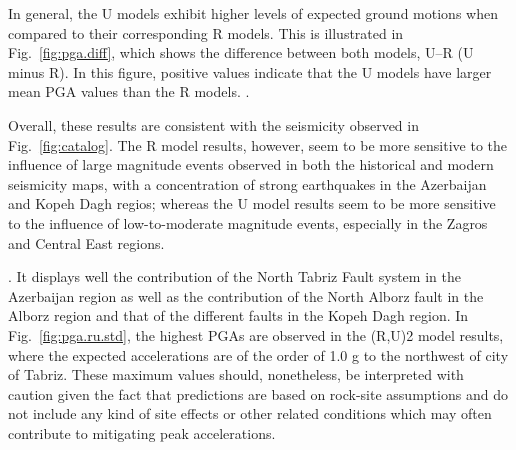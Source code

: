 In general, the U models exhibit higher levels of expected ground motions when compared to their corresponding R models. This is illustrated in Fig.~\ref{fig:pga.diff}, which shows the difference between both models, U--R (U minus R). In this figure, positive values indicate that the U models have larger mean PGA values than the R models. .

Overall, these results are consistent with the seismicity observed in Fig.~\ref{fig:catalog}. The R model results, however, seem to be more sensitive to the influence of large magnitude events observed in both the historical and modern seismicity maps, with a concentration of strong earthquakes in the Azerbaijan and Kopeh Dagh regios; whereas the U model results seem to be more sensitive to the influence of low-to-moderate magnitude events, especially in the Zagros and Central East regions.


. It displays well the contribution of the North Tabriz Fault system in the Azerbaijan region as well as the contribution of the North Alborz fault in the Alborz region and that of the different faults in the Kopeh Dagh region. In Fig.~\ref{fig:pga.ru.std}, the highest PGAs are observed in the (R,U)2 model results, where the expected accelerations are of the order of 1.0 g to the northwest of  city of Tabriz. These maximum values should, nonetheless, be interpreted with caution given the fact that predictions are based on rock-site assumptions and do not include any kind of site effects or other related conditions which may often contribute to mitigating peak accelerations.

